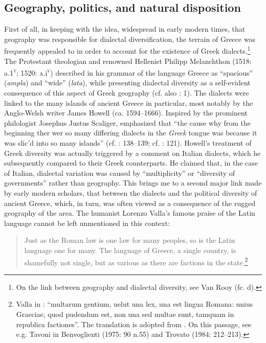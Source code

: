 \documentclass[output=paper]{langsci/langscibook}
\begin{document}
\subsection{Geography, politics, and natural disposition}
\hypertarget{Toc19704854}{}
First of all, in keeping with the idea, widespread in early modern times, that geography was responsible for dialectal diversification, the terrain of Greece was frequently appealed to in order to account for the existence of Greek dialects.\footnote{On the link between geography and dialectal diversity, see Van Rooy (fc. d).} The Protestant theologian and renowned Hellenist Philipp Melanchthon (1518: a.1\textsc{\textsuperscript{v}}; 1520: \textsc{a.}i\textsc{\textsuperscript{v}}) described in his grammar of the language Greece as “spacious” (\textit{ampla}) and “wide” (\textit{lata}), while presenting dialectal diversity as a self-evident consequence of this aspect of Greek geography (cf. also \citealt{Ruland1556}: 1). The dialects were linked to the many islands of ancient Greece in particular, most notably by the Anglo-Welsh writer James Howell (ca. 1594–1666). Inspired by the prominent philologist Josephus Justus Scaliger, \citet[89]{Howell1650b} emphasized that “the cause why from the beginning ther wer so many differing dialects in the \textit{Greek} tongue was because it was slic’d into so many islands” (cf. \citealt{Howell1642}: 138–139; cf. \citealt{Scaliger1610}: 121). Howell’s treatment of Greek diversity was actually triggered by a comment on Italian dialects, which he subsequently compared to their Greek counterparts. He claimed that, in the case of Italian, dialectal variation was caused by “multiplicity” or “diversity of governments” rather than geography. This brings me to a second major link made by early modern scholars, that between the dialects and the political diversity of ancient Greece, which, in turn, was often viewed as a consequence of the rugged geography of the area. The humanist Lorenzo Valla’s famous praise of the Latin language cannot be left unmentioned in this context:

\begin{quote}
Just as the Roman law is one law for many peoples, so is the Latin language one for many. The language of Greece, a single country, is shamefully not single, but as various as there are factions in the state.\footnote{Valla in \citet[122]{Regoliosi1993}: “multarum gentium, uelut una lex, una est lingua Romana: unius Graeciae, quod pudendum est, non una sed multae sunt, tamquam in republica factiones”. The translation is adopted from \citet[10]{Trapp1990}. On this passage, see e.g. Tavoni in Benvoglienti (1975: 90 n.55) and Trovato (1984: 212–213).}
\end{quote}
\end{document}

